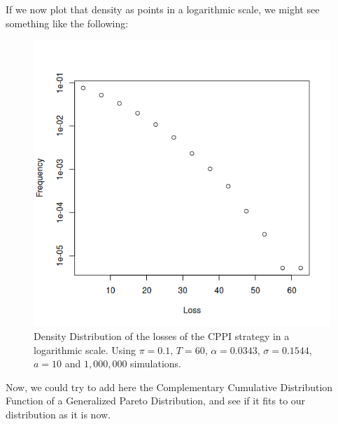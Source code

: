 If we now plot that density as points in a logarithmic scale, we might see something like the following:

\begin{figure}[h]
    \centering
    \includegraphics[scale=0.75]{images/cppi-dens-points.png}
    \caption{Density Distribution of the losses of the CPPI strategy in a logarithmic scale. Using $\pi = 0.1$, $T=60$, $\alpha = 0.0343$, $\sigma = 0.1544$, $a=10$ and $1,000,000$ simulations.}
    \label{fig:cppi-dens-points}
\end{figure}

Now, we could try to add here the Complementary Cumulative Distribution Function of a Generalized Pareto Distribution, and see if it fits to our distribution as it is now.


